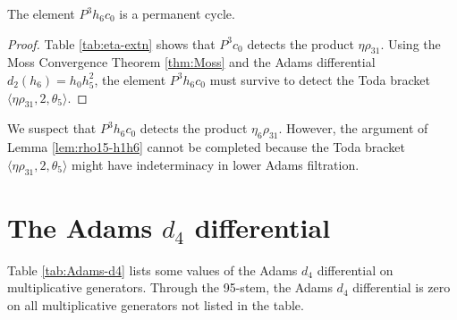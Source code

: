 \begin{lemma}
\label{lem:perm-P^3h6c0}
The element $P^3 h_6 c_0$ is a permanent cycle.
\end{lemma}

\begin{proof}
Table \ref{tab:eta-extn} shows that
$P^3 c_0$ detects the product $\eta \rho_{31}$.
Using the Moss Convergence Theorem \ref{thm:Moss} 
and the Adams differential $d_2(h_6) = h_0 h_5^2$,
the element $P^3 h_6 c_0$ must survive to detect the
Toda bracket
$\langle \eta \rho_{31}, 2, \theta_5 \rangle$.
\end{proof}

\begin{remark}
\label{rem:perm-P^3h6c0}
We suspect that $P^3 h_6 c_0$ detects the product
$\eta_6 \rho_{31}$.  However, the argument of
Lemma \ref{lem:rho15-h1h6} cannot be completed because
the Toda bracket
$\langle \eta \rho_{31}, 2, \theta_5 \rangle$ might
have indeterminacy in lower Adams filtration.
\end{remark}

\section{The Adams $d_4$ differential}
\label{sctn:Adams-d4}


\begin{thm}
\label{thm:Adams-d4}
Table \ref{tab:Adams-d4} lists some values of the
Adams $d_4$ differential on multiplicative generators.
Through the 95-stem, 
the Adams $d_4$ differential is zero on all multiplicative
generators not listed in the table.
\end{thm}

